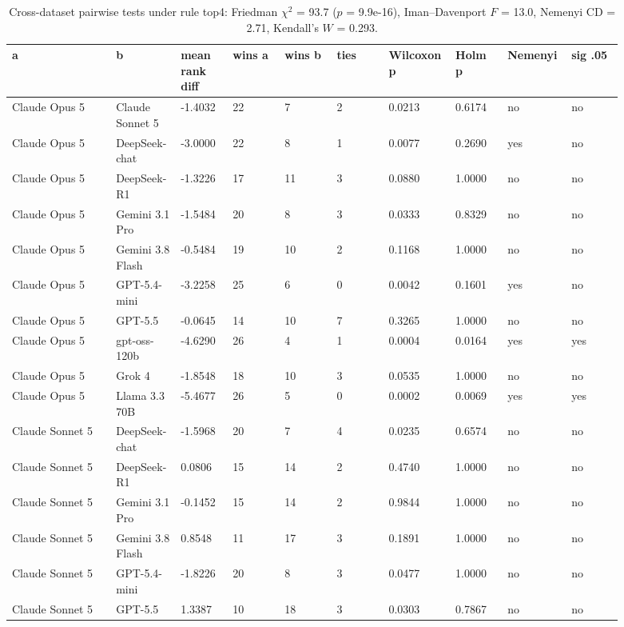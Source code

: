 \begin{landscape}
\tiny
\setlength{\tabcolsep}{3pt}
\begin{longtable}{p{0.162\linewidth}p{0.081\linewidth}p{0.081\linewidth}p{0.081\linewidth}p{0.081\linewidth}p{0.081\linewidth}p{0.081\linewidth}p{0.081\linewidth}p{0.081\linewidth}p{0.081\linewidth}}
\caption{Cross-dataset pairwise tests under rule top4: Friedman $\chi^2$ = 93.7 ($p$ = 9.9e-16), Iman--Davenport $F$ = 13.0, Nemenyi CD = 2.71, Kendall's $W$ = 0.293.}\label{tab:pairwise_top4}\\
\toprule
a & b & mean rank diff & wins a & wins b & ties & Wilcoxon p & Holm p & Nemenyi & sig .05 \\
\midrule
Claude Opus 5 & Claude Sonnet 5 & -1.4032 & 22 & 7 & 2 & 0.0213 & 0.6174 & no & no \\
Claude Opus 5 & DeepSeek-chat & -3.0000 & 22 & 8 & 1 & 0.0077 & 0.2690 & yes & no \\
Claude Opus 5 & DeepSeek-R1 & -1.3226 & 17 & 11 & 3 & 0.0880 & 1.0000 & no & no \\
Claude Opus 5 & Gemini 3.1 Pro & -1.5484 & 20 & 8 & 3 & 0.0333 & 0.8329 & no & no \\
Claude Opus 5 & Gemini 3.8 Flash & -0.5484 & 19 & 10 & 2 & 0.1168 & 1.0000 & no & no \\
Claude Opus 5 & GPT-5.4-mini & -3.2258 & 25 & 6 & 0 & 0.0042 & 0.1601 & yes & no \\
Claude Opus 5 & GPT-5.5 & -0.0645 & 14 & 10 & 7 & 0.3265 & 1.0000 & no & no \\
Claude Opus 5 & gpt-oss-120b & -4.6290 & 26 & 4 & 1 & 0.0004 & 0.0164 & yes & yes \\
Claude Opus 5 & Grok 4 & -1.8548 & 18 & 10 & 3 & 0.0535 & 1.0000 & no & no \\
Claude Opus 5 & Llama 3.3 70B & -5.4677 & 26 & 5 & 0 & 0.0002 & 0.0069 & yes & yes \\
Claude Sonnet 5 & DeepSeek-chat & -1.5968 & 20 & 7 & 4 & 0.0235 & 0.6574 & no & no \\
Claude Sonnet 5 & DeepSeek-R1 & 0.0806 & 15 & 14 & 2 & 0.4740 & 1.0000 & no & no \\
Claude Sonnet 5 & Gemini 3.1 Pro & -0.1452 & 15 & 14 & 2 & 0.9844 & 1.0000 & no & no \\
Claude Sonnet 5 & Gemini 3.8 Flash & 0.8548 & 11 & 17 & 3 & 0.1891 & 1.0000 & no & no \\
Claude Sonnet 5 & GPT-5.4-mini & -1.8226 & 20 & 8 & 3 & 0.0477 & 1.0000 & no & no \\
Claude Sonnet 5 & GPT-5.5 & 1.3387 & 10 & 18 & 3 & 0.0303 & 0.7867 & no & no \\

\end{longtable}
\end{landscape}
